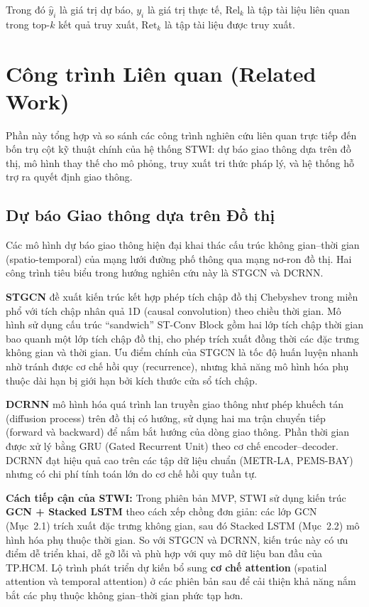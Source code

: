 Trong đó $\hat{y}_i$ là giá trị dự báo, $y_i$ là giá trị thực tế, $\text{Rel}_k$ là tập tài liệu liên quan trong top-$k$ kết quả truy xuất, $\text{Ret}_k$ là tập tài liệu được truy xuất.

\section{Công trình Liên quan (Related Work)}

Phần này tổng hợp và so sánh các công trình nghiên cứu liên quan trực tiếp đến bốn trụ cột kỹ thuật chính của hệ thống STWI: dự báo giao thông dựa trên đồ thị, mô hình thay thế cho mô phỏng, truy xuất tri thức pháp lý, và hệ thống hỗ trợ ra quyết định giao thông.

\subsection{Dự báo Giao thông dựa trên Đồ thị}

Các mô hình dự báo giao thông hiện đại khai thác cấu trúc không gian--thời gian (spatio-temporal) của mạng lưới đường phố thông qua mạng nơ-ron đồ thị. Hai công trình tiêu biểu trong hướng nghiên cứu này là STGCN và DCRNN.

\textbf{STGCN} \cite{yu2018stgcn} đề xuất kiến trúc kết hợp phép tích chập đồ thị Chebyshev trong miền phổ với tích chập nhân quả 1D (causal convolution) theo chiều thời gian. Mô hình sử dụng cấu trúc ``sandwich'' ST-Conv Block gồm hai lớp tích chập thời gian bao quanh một lớp tích chập đồ thị, cho phép trích xuất đồng thời các đặc trưng không gian và thời gian. Ưu điểm chính của STGCN là tốc độ huấn luyện nhanh nhờ tránh được cơ chế hồi quy (recurrence), nhưng khả năng mô hình hóa phụ thuộc dài hạn bị giới hạn bởi kích thước cửa sổ tích chập.

\textbf{DCRNN} \cite{li2018diffusion} mô hình hóa quá trình lan truyền giao thông như phép khuếch tán (diffusion process) trên đồ thị có hướng, sử dụng hai ma trận chuyển tiếp (forward và backward) để nắm bắt hướng của dòng giao thông. Phần thời gian được xử lý bằng GRU (Gated Recurrent Unit) theo cơ chế encoder--decoder. DCRNN đạt hiệu quả cao trên các tập dữ liệu chuẩn (METR-LA, PEMS-BAY) nhưng có chi phí tính toán lớn do cơ chế hồi quy tuần tự.

\textbf{Cách tiếp cận của STWI:} Trong phiên bản MVP, STWI sử dụng kiến trúc \textbf{GCN + Stacked LSTM} theo cách xếp chồng đơn giản: các lớp GCN (Mục~2.1) trích xuất đặc trưng không gian, sau đó Stacked LSTM (Mục~2.2) mô hình hóa phụ thuộc thời gian. So với STGCN và DCRNN, kiến trúc này có ưu điểm dễ triển khai, dễ gỡ lỗi và phù hợp với quy mô dữ liệu ban đầu của TP.HCM. Lộ trình phát triển dự kiến bổ sung \textbf{cơ chế attention} (spatial attention và temporal attention) ở các phiên bản sau để cải thiện khả năng nắm bắt các phụ thuộc không gian--thời gian phức tạp hơn.

